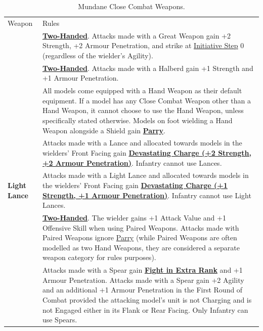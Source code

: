 \begin{table}[!htbp]
	\centering
	\begin{tabular}{>{\raggedleft}p{3cm} p{12.5cm}}
	  \toprule
	  Weapon & Rules \\
	    \textbf{\gw}\idx[main=y]{\gw} & \hyperref[twohanded]{\textbf{Two-Handed}}. Attacks made with a Great Weapon gain +2 Strength, +2 Armour Penetration, and  strike at \hyperref[initiative_order]{Initiative Step} 0 (regardless of the wielder's Agility). \\
	  \textbf{\halberd}\idx[main=y]{\halberd} & \hyperref[twohanded]{\textbf{Two-Handed}}. Attacks made with a Halberd gain +1 Strength and +1 Armour Penetration. \\
	  \textbf{\hw}\idx[main=y]{\hw} & All models come equipped with a Hand Weapon as their default equipment. If a model has any Close Combat Weapon other than a Hand Weapon, it cannot choose to use the Hand Weapon, unless specifically stated otherwise. Models on foot wielding a Hand Weapon alongside a Shield gain \hyperref[parry]{\textbf{Parry}}.\\
	    \textbf{\lance}\idx[main=y]{\lance} & Attacks made with a Lance and allocated towards models in the wielders' Front Facing gain \hyperref[devastating_charge]{\textbf{Devastating Charge (+2 Strength, +2 Armour Penetration)}}. Infantry cannot use Lances.\\
	  \textbf{Light Lance}\idx[main=y]{\lightlance} & Attacks made with a Light Lance and allocated towards models in the wielders' Front Facing gain \hyperref[devastating_charge]{\textbf{Devastating Charge (+1 Strength, +1 Armour Penetration)}}. Infantry cannot use Light Lances.\\
	  \textbf{\pw}\idx[main=y]{\pw} & \hyperref[twohanded]{\textbf{Two-Handed}}. The wielder gains +1 Attack Value and +1 Offensive Skill when using Paired Weapons. Attacks made with Paired Weapons ignore \hyperref[parry]{Parry} (while Paired Weapons are often modelled as two Hand Weapons, they are considered a separate weapon category for rules purposes).\\
	  \textbf{\spear}\idx[main=y]{\spear} & Attacks made with a Spear gain \hyperref[fight_in_extra_rank]{\textbf{Fight in Extra Rank}} and +1 Armour Penetration. Attacks made with a Spear gain +2 Agility and an additional +1 Armour Penetration in the First Round of Combat provided the attacking model's unit is not Charging and is not Engaged either in its Flank or Rear Facing. Only Infantry can use Spears.\\
	  \bottomrule
	\end{tabular}
	\caption{Mundane Close Combat Weapons.}
	\label{table/cc_weapons}
\end{table}

